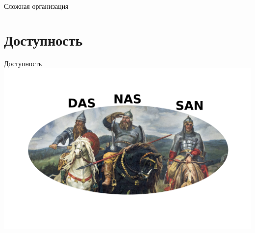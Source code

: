 \documentclass[aspectratio=169]{beamer}
\begin{document}
\begin{frame}{Сложная организация}
    \organization
\end{frame}

\section{Доступность}

\begin{frame}{Доступность}
    \centering
    \includegraphics[scale=1.3]{fig/2.tri.png}
\end{frame}
\end{document}
